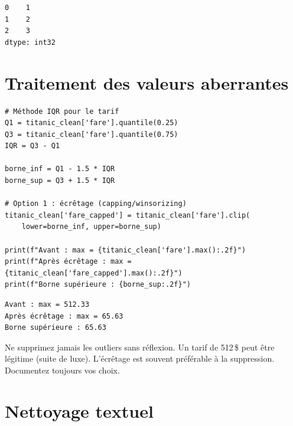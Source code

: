 \begin{codeoutput}
\begin{verbatim}
0    1
1    2
2    3
dtype: int32
\end{verbatim}
\end{codeoutput}

\section{Traitement des valeurs aberrantes}

\begin{codeblock}[title=\textbf{Python}]
\begin{verbatim}
# Méthode IQR pour le tarif
Q1 = titanic_clean['fare'].quantile(0.25)
Q3 = titanic_clean['fare'].quantile(0.75)
IQR = Q3 - Q1

borne_inf = Q1 - 1.5 * IQR
borne_sup = Q3 + 1.5 * IQR

# Option 1 : écrêtage (capping/winsorizing)
titanic_clean['fare_capped'] = titanic_clean['fare'].clip(
    lower=borne_inf, upper=borne_sup)

print(f"Avant : max = {titanic_clean['fare'].max():.2f}")
print(f"Après écrêtage : max = {titanic_clean['fare_capped'].max():.2f}")
print(f"Borne supérieure : {borne_sup:.2f}")
\end{verbatim}
\end{codeblock}

\begin{codeoutput}
\begin{verbatim}
Avant : max = 512.33
Après écrêtage : max = 65.63
Borne supérieure : 65.63
\end{verbatim}
\end{codeoutput}

\begin{attention}
Ne supprimez jamais les outliers sans r\'eflexion. Un tarif de 512\,\$ peut \^etre l\'egitime (suite de luxe). L'\'ecr\^etage est souvent pr\'ef\'erable \`a la suppression. Documentez toujours vos choix.
\end{attention}

\section{Nettoyage textuel}

